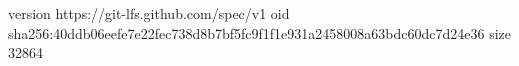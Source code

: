 version https://git-lfs.github.com/spec/v1
oid sha256:40ddb06eefe7e22fec738d8b7bf5fc9f1f1e931a2458008a63bdc60dc7d24e36
size 32864
